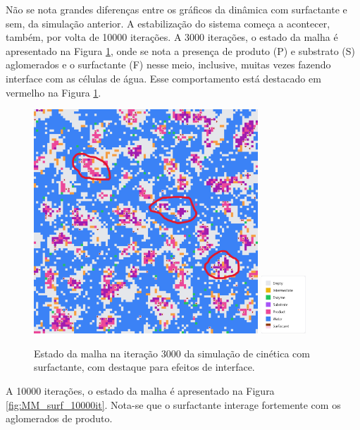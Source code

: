 \documentclass[12pt,oneside]{report}
\begin{document}
Não se nota grandes diferenças entre os gráficos da dinâmica com surfactante e sem, da simulação anterior. A estabilização do sistema começa a acontecer, também, por volta de 10000 iterações. A 3000 iterações, o estado da malha é apresentado na Figura \ref{fig:MM_surf_3000it}, onde se nota a presença de produto (P) e substrato (S) aglomerados e o surfactante (F) nesse meio, inclusive, muitas vezes fazendo interface com as células de água. Esse comportamento está destacado em vermelho na Figura \ref{fig:MM_surf_3000it}.

\begin{figure}[H]
    \centering
    \includegraphics[width=0.75\textwidth]{img/surf_3000.png}
    \hspace{0.05\textwidth}
    \includegraphics[width=0.15\textwidth]{img/legend_surf.png}
    \caption{\small Estado da malha na iteração 3000 da simulação de cinética com surfactante, com destaque para efeitos de interface.}
    \label{fig:MM_surf_3000it}
\end{figure}

A 10000 iterações, o estado da malha é apresentado na Figura \ref{fig:MM_surf_10000it}. Nota-se que o surfactante interage fortemente com os aglomerados de produto.
\end{document}
